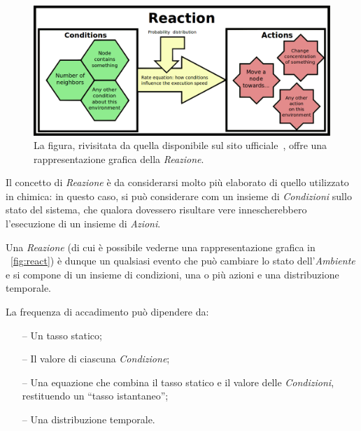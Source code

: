 \begin{description}
                \begin{figure}[htbp]
                    \centering
                    \includegraphics[scale=.35]{img/reaction}
                    \caption{%
                        La figura, rivisitata da quella disponibile sul sito ufficiale~\cite{alchemistWeb}, offre una rappresentazione grafica della \emph{Reazione}.
                    }
                    \label{fig:react}
                \end{figure}

                \item[\engEmph{Reaction}\label{itm:react}]
                    Il concetto di \emph{Reazione} è da considerarsi molto più elaborato di quello utilizzato in chimica: in questo caso, si può considerare com un insieme di \emph{Condizioni} sullo stato del sistema, che qualora dovessero risultare vere innescherebbero l'esecuzione di un insieme di \emph{Azioni}.

                    Una \emph{Reazione} (di cui è possibile vederne una rappresentazione grafica in \figurename~\vref{fig:react}) è dunque un qualsiasi evento che può cambiare lo stato dell’\emph{Ambiente} e si compone di un insieme di condizioni, una o più azioni e una distribuzione temporale.

                    La frequenza di accadimento può dipendere da:
                    \begin{itemize}
                        \item[--] Un tasso statico;
                        \item[--] Il valore di ciascuna \emph{Condizione};
                        \item[--] Una equazione che combina il tasso statico e il valore delle \emph{Condizioni}, restituendo un ``tasso istantaneo'';
                        \item[--] Una distribuzione temporale.
                    \end{itemize}


\end{description}
